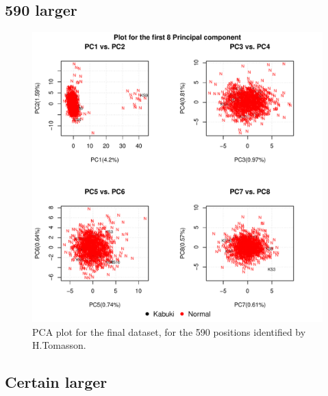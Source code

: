 \subsection{590 larger}
\iffalse
\begin{figure}[!h]
    \centering
    \includegraphics[width=\textwidth]{figures/PCA/590/pca_plot_label_larger.pdf}
    \caption{PCA plot for the final dataset, for the 590 positions identified by H.Tomasson.}
    \label{fig:certain-PCA}
\end{figure}

\subsection{Certain larger}

